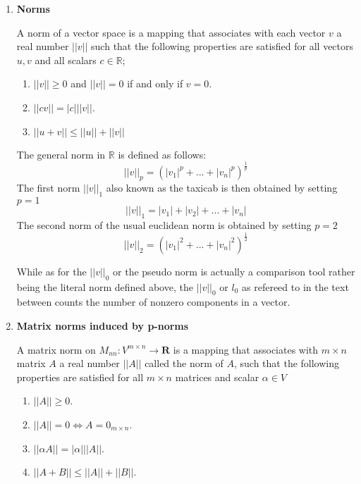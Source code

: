 \begin{enumerate}
\item{\textbf{Norms}}

A norm of a vector space is a mapping that associates with each vector $ v $ a real number $||v||$ such that the following properties are satisfied for all vectors $ u, v $ and all scalars $ c \in \mathbb{R} $; 
\begin{enumerate}
	\item $ ||v|| \geq 0 $ and $ ||v|| = 0 $ if and only if $ v = 0 $.
	\item $||cv|| = |c| ||v||$.
	\item $||u+v|| \leq ||u|| + ||v||$
\end{enumerate}
The general norm in $ \mathbb{R} $ is defined as follows: 
\begin{equation}\label{key}
||v||_p = (|v_1|^p + ... + |v_n|^p)^{\frac{1}{p}}
\end{equation}
The first norm $ ||v||_1 $ also known as the taxicab is then obtained by setting $ p = 1 $ \begin{equation}\label{key}
||v||_1 = |v_1| + |v_2| + ... + |v_n|
\end{equation}
The second norm of the usual euclidean norm is obtained by setting $ p = 2 $ \begin{equation}\label{key}
||v||_2 = (|v_1|^2+...+|v_n|^2)^{\frac{1}{2}}
\end{equation} 

While as for the $ ||v||_0 $ or the pseudo norm is actually a comparison tool rather being the literal norm defined above, the $ ||v||_0 $ or $ l_0 $ as refereed to in the text  between counts the number of nonzero components in a vector. 
\item{\textbf{Matrix norms induced by  p-norms}}

A matrix norm on $ M_{nn} : V^{m\times n} \longrightarrow \mathbf{R}$ is a mapping that associates with $ m\times n $ matrix $ A $ a real number $ ||A|| $ called the norm of $ A $, such that the following properties are satisfied for all $ m \times n $ matrices and scalar $ \alpha \in V$ \begin{enumerate}
	\item $ ||A|| \geq 0 $.
	\item $ ||A|| = 0 \Longleftrightarrow A = 0_{m\times n} $. 
	\item $ ||\alpha A|| = |\alpha| ||A||$.
	\item $ ||A+B|| \leq ||A|| + ||B|| $.
\end{enumerate}


\end{enumerate}
